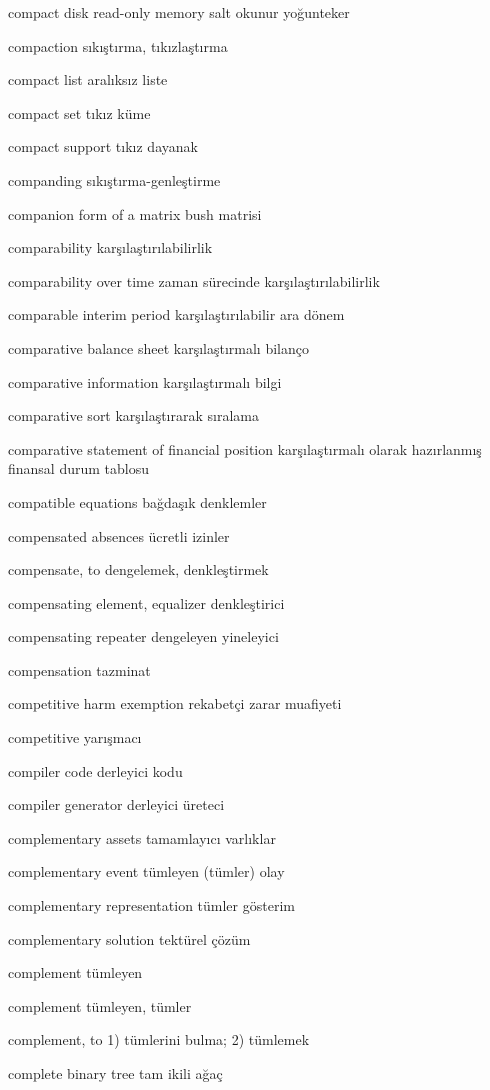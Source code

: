 \documentclass[12pt,fleqn]{article}\usepackage{../../common}
\begin{document}
compact disk read-only memory salt okunur yoğunteker

compaction sıkıştırma, tıkızlaştırma

compact list aralıksız liste

compact set tıkız küme

compact support tıkız dayanak

companding sıkıştırma-genleştirme

companion form of a matrix bush matrisi

comparability karşılaştırılabilirlik

comparability over time zaman sürecinde karşılaştırılabilirlik

comparable interim period karşılaştırılabilir ara dönem

comparative balance sheet karşılaştırmalı bilanço

comparative information karşılaştırmalı bilgi

comparative sort karşılaştırarak sıralama

comparative statement of financial position karşılaştırmalı olarak hazırlanmış finansal durum tablosu

compatible equations bağdaşık denklemler

compensated absences ücretli izinler

compensate, to dengelemek, denkleştirmek

compensating element, equalizer denkleştirici

compensating repeater dengeleyen yineleyici

compensation tazminat

competitive harm exemption rekabetçi zarar muafiyeti

competitive yarışmacı

compiler code derleyici kodu

compiler generator derleyici üreteci

complementary assets tamamlayıcı varlıklar

complementary event tümleyen (tümler) olay

complementary representation tümler gösterim

complementary solution tektürel çözüm

complement tümleyen

complement tümleyen, tümler

complement, to 1) tümlerini bulma; 2) tümlemek

complete binary tree tam ikili ağaç
\end{document}
